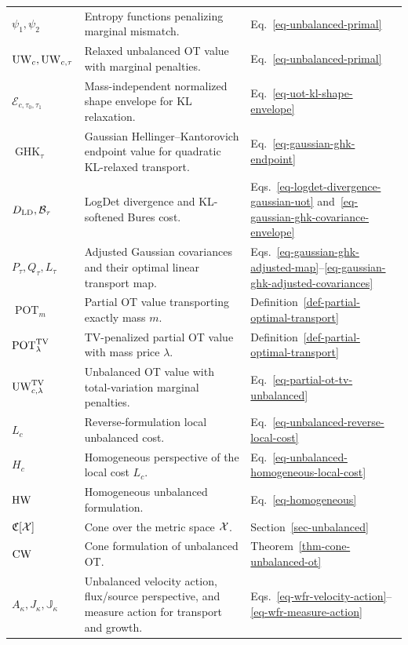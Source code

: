 {\begin{longtable}{>{\raggedright\arraybackslash}p{}
                  >{\raggedright\arraybackslash}p{}
                  >{\raggedright\arraybackslash}p{}}
\hline
\multicolumn{3}{l}{\textbf{Extensions of OT}}\\
\hline
$\psi_1,\psi_2$ & Entropy functions penalizing marginal mismatch. & Eq.~\eqref{eq-unbalanced-primal} \\
$\operatorname{UW}_c,\operatorname{UW}_{c,\tau}$ & Relaxed unbalanced OT value with marginal penalties. & Eq.~\eqref{eq-unbalanced-primal} \\
$\mathcal E_{c,\tau_0,\tau_1}$ & Mass-independent normalized shape envelope for KL relaxation. & Eq.~\eqref{eq-uot-kl-shape-envelope} \\
$\operatorname{GHK}_\tau$ & Gaussian Hellinger--Kantorovich endpoint value for quadratic KL-relaxed transport. & Eq.~\eqref{eq-gaussian-ghk-endpoint} \\
$D_{\mathrm{LD}},\mathcal{B}_\tau$ & LogDet divergence and KL-softened Bures cost. & Eqs.~\eqref{eq-logdet-divergence-gaussian-uot} and~\eqref{eq-gaussian-ghk-covariance-envelope} \\
$P_\tau,Q_\tau,L_\tau$ & Adjusted Gaussian covariances and their optimal linear transport map. & Eqs.~\eqref{eq-gaussian-ghk-adjusted-map}--\eqref{eq-gaussian-ghk-adjusted-covariances} \\
$\operatorname{POT}_m$ & Partial OT value transporting exactly mass $m$. & Definition~\ref{def-partial-optimal-transport} \\
$\operatorname{POT}^{\operatorname{TV}}_\lambda$ & TV-penalized partial OT value with mass price $\lambda$. & Definition~\ref{def-partial-optimal-transport} \\
$\operatorname{UW}_{c,\lambda}^{\operatorname{TV}}$ & Unbalanced OT value with total-variation marginal penalties. & Eq.~\eqref{eq-partial-ot-tv-unbalanced} \\
$L_c$ & Reverse-formulation local unbalanced cost. & Eq.~\eqref{eq-unbalanced-reverse-local-cost} \\
$H_c$ & Homogeneous perspective of the local cost $L_c$. & Eq.~\eqref{eq-unbalanced-homogeneous-local-cost} \\
$\operatorname{HW}$ & Homogeneous unbalanced formulation. & Eq.~\eqref{eq-homogeneous} \\
$\mathfrak{C}[\mathcal{X}]$ & Cone over the metric space $\mathcal{X}$. & Section~\ref{sec-unbalanced} \\
$\operatorname{CW}$ & Cone formulation of unbalanced OT\@. & Theorem~\ref{thm-cone-unbalanced-ot} \\
$A_\kappa,J_\kappa,\mathbb J_\kappa$ & Unbalanced velocity action, flux/source perspective, and measure action for transport and growth. & Eqs.~\eqref{eq-wfr-velocity-action}--\eqref{eq-wfr-measure-action} \\

\end{longtable}}
